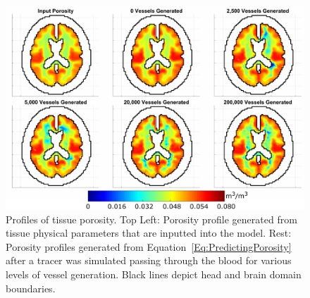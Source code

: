 \documentclass[11pt,english,a4paper,twoside,openright]{report}
\begin{document}
{{{{{{{{\begin{figure}[p]
	\centering
	\includegraphics[width=\textwidth]{Chapter4/TracerPorosity}
	\caption[Profiles of tissue porosity generated using the continuous tracer method compared to the input porosity]{Profiles of tissue porosity. Top Left: Porosity profile generated from tissue physical parameters that are inputted into the model. Rest: Porosity profiles generated from Equation~\ref{Eq:PredictingPorosity} after a tracer was simulated passing through the blood for various levels of vessel generation. Black lines depict head and brain domain boundaries.}
	\label{fig:TracerResultsPorosity}
\end{figure}

}}}}}}}}
\end{document}
